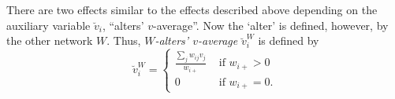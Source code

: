 \documentclass[a4paper,fleqn,11pt]{article}
\newcommand{\+}{\, + \,}
\newcounter{savenumi}
\begin{document}
\begin{enumerate}
\setcounter{savenumi}{\value{enumi}}
\end{enumerate}


\noindent
There are two effects similar to the effects described above
depending on the auxiliary variable $\breve v_i$,
``alters' $v$-average''.
Now the `alter' is defined, however, by the other network $W$.
Thus, \emph{$W$-alters' $v$-average} $\breve v_i^W$ is defined by
\begin{equation}
  \breve v_i^W = \left\{\begin{array}{ll} \displaystyle
         \frac{\sum_j w_{ij}v_j}{w_{i+}}  &  \text{ if } w_{i+} > 0     \\
         0                                &  \text{ if } w_{i+} = 0  .
  \end{array}   \right.            \label{alt_av_w}
\end{equation}
\end{document}
